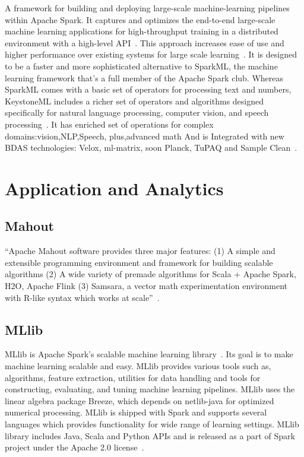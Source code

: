 A framework for building and deploying large-scale machine-learning
pipelines within Apache Spark. It captures and optimizes the
end-to-end large-scale machine learning applications for
high-throughput training in a distributed environment with a
high-level API~\cite{sparks2016keystoneml}. This approach increases
ease of use and higher performance over existing systems for large
scale learning~\cite{sparks2016keystoneml}. It is designed to be a
faster and more sophisticated alternative to SparkML, the machine
learning framework that's a full member of the Apache Spark
club. Whereas SparkML comes with a basic set of operators for
processing text and numbers, KeystoneML includes a richer set of
operators and algorithms designed specifically for natural language
processing, computer vision, and speech processing~\cite{building}. It
has enriched set of operations for complex domains:vision,NLP,Speech,
plus,advanced math And is Integrated with new BDAS technologies:
Velox, ml-matrix, soon Planck, TuPAQ and Sample Clean~\cite{spark}.

\section{Application and Analytics}
\label{S:o-application}

\subsection{Mahout}

``Apache Mahout software provides three major features: (1) A simple
and extensible programming environment and framework for building
scalable algorithms (2) A wide variety of premade algorithms for Scala
+ Apache Spark, H2O, Apache Flink (3) Samsara, a vector math
experimentation environment with R-like syntax which works at
scale''~\cite{www-mahout}.

    \pv


\subsection{MLlib}

MLlib is Apache Spark's scalable machine learning
library~\cite{www-mllib}. Its goal is to make machine learning
scalable and easy. MLlib provides various tools such as, algorithms,
feature extraction, utilities for data handling and tools for
constructing, evaluating, and tuning machine learning pipelines. MLlib
uses the linear algebra package Breeze, which depends on netlib-java
for optimized numerical processing. MLlib is shipped with Spark and
supports several languages which provides functionality for wide range
of learning settings. MLlib library includes Java, Scala and Python
APIs and is released as a part of Spark project under the Apache 2.0
license~\cite{MLlib-article}.

